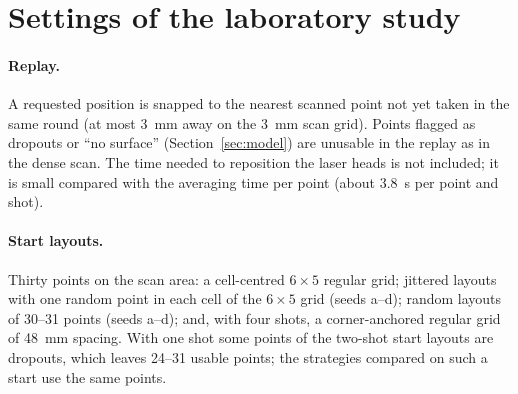 
\section{Settings of the laboratory study}\label{app:protocols}

\paragraph{Replay.} A requested position is snapped to the nearest scanned point not yet taken in the same round
(at most \SI{3}{mm} away on the \SI{3}{mm} scan grid). Points flagged as dropouts or ``no surface''
(Section~\ref{sec:model}) are unusable in the replay as in the dense scan. The time needed to reposition the laser
heads is not included; it is small compared with the averaging time per point (about \SI{3.8}{s} per point and shot).

\paragraph{Start layouts.} Thirty points on the scan area: a cell-centred $6\times5$ regular grid; jittered layouts
with one random point in each cell of the $6\times5$ grid (seeds a--d); random layouts of 30--31 points (seeds a--d);
and, with four shots, a corner-anchored regular grid of \SI{48}{mm} spacing. With one shot some points of the
two-shot start layouts are dropouts, which leaves 24--31 usable points; the strategies compared on such a start use
the same points.


